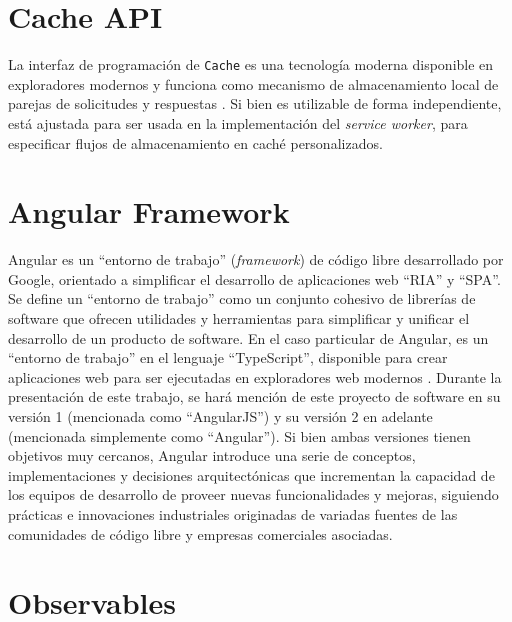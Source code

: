 \section{Cache API}

La interfaz de programación de \texttt{Cache} es una tecnología moderna disponible en exploradores modernos y funciona como mecanismo de almacenamiento local de parejas de solicitudes y respuestas \cite{serviceworker}. Si bien es utilizable de forma independiente, está ajustada para ser usada en la implementación del \textit{service worker}, para especificar flujos de almacenamiento en caché personalizados.

\section{Angular Framework}

Angular es un ``entorno de trabajo'' (\textit{framework}) de código libre desarrollado por Google, orientado a simplificar el desarrollo de aplicaciones web ``RIA'' y ``SPA''. Se define un ``entorno de trabajo'' como un conjunto cohesivo de librerías de software que ofrecen utilidades y herramientas para simplificar y unificar el desarrollo de un producto de software. En el caso particular de Angular, es un ``entorno de trabajo'' en el lenguaje ``TypeScript'', disponible para crear aplicaciones web para ser ejecutadas en exploradores web modernos \cite{angular}. Durante la presentación de este trabajo, se hará mención de este proyecto de software en su versión 1 (mencionada como ``AngularJS'') y su versión 2 en adelante (mencionada simplemente como ``Angular''). Si bien ambas versiones tienen objetivos muy cercanos, Angular introduce una serie de conceptos, implementaciones y decisiones arquitectónicas que incrementan la capacidad de los equipos de desarrollo de proveer nuevas funcionalidades y mejoras, siguiendo prácticas e innovaciones industriales originadas de variadas fuentes de las comunidades de código libre y empresas comerciales asociadas.

\section{Observables}

